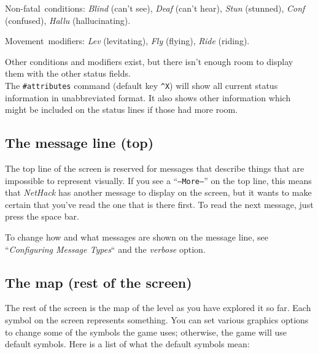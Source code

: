 Non-fatal~conditions:
{\it Blind\/} (can't see), {\it Deaf\/} (can't hear),
{\it Stun\/} (stunned), {\it Conf\/} (confused), {\it Hallu\/} (hallucinating).

Movement~modifiers:
{\it Lev\/} (levitating), {\it Fly\/} (flying), {\it Ride\/} (riding).

Other conditions and modifiers exist, but there isn't enough room to
display them with the other status fields.
\\
The {\tt \#attributes} command (default key {\tt \^{}X}) will show
all current status information in unabbreviated format.
It also shows other information which might be included on the status
lines if those had more room.

\elist

\subsection*{The message line (top)}

The top line of the screen is reserved for messages that describe
things that are impossible to represent visually.  If you see a
``{\tt --More--}'' on the top line, this means that {\it NetHack\/} has
another message to display on the screen, but it wants to make certain
that you've read the one that is there first.  To read the next message,
just press the space bar.

To change how and what messages are shown on the message line,
see ``{\it Configuring Message Types\/}`` and the {\it verbose\/}
option.

\subsection*{The map (rest of the screen)}

The rest of the screen is the map of the level as you have explored it
so far.  Each symbol on the screen represents something.  You can set
various graphics
options to change some of the symbols the game uses; otherwise, the
game will use default symbols.  Here is a list of what the default
symbols mean:

